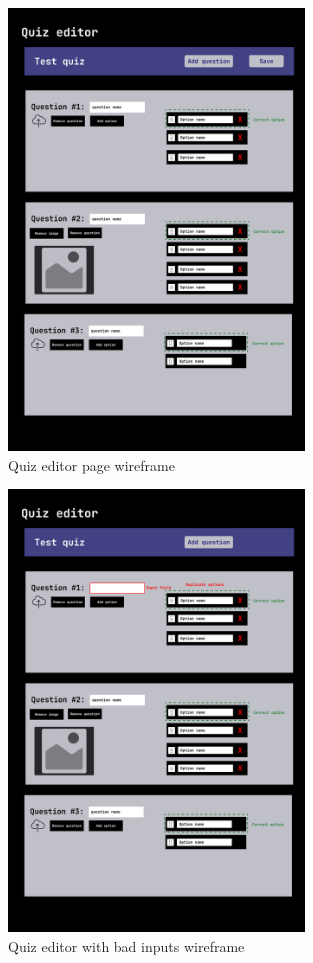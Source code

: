 \documentclass[
    english, %
]{VUMIFPSkursinis}
\begin{document}
\begin{figure}[ht]
    \centering
    \includegraphics[width=0.7\textwidth]{../lab3diags/proper-quiz-editor.png}
    \caption{Quiz editor page wireframe}
    \label{wireframe-quiz-editor}
\end{figure}

\pagebreak

\begin{figure}[ht]
    \centering
    \includegraphics[width=0.7\textwidth]{../lab3diags/Quiz editor bad inputs.png}
    \caption{Quiz editor with bad inputs wireframe}
    \label{wireframe-quiz-editor-bad}
\end{figure}
\end{document}
